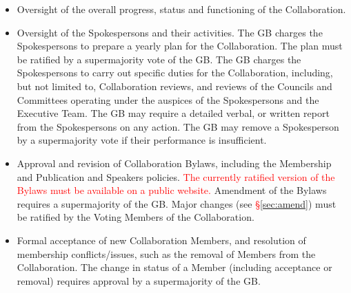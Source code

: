 \documentclass[12pt]{article}
\newcommand{\exec}{{Executive Team}}
\begin{document}
\begin{itemize}
\item Oversight of the overall progress, status and functioning of the Collaboration.  

\item Oversight of the Spokespersons and their activities.  The GB charges the Spokespersons to prepare a yearly plan for the Collaboration.  The plan must be ratified by a supermajority vote of the GB.  The GB charges the Spokespersons to carry out specific duties for the Collaboration, including, but not limited to, Collaboration reviews, and reviews of the Councils and Committees operating under the auspices of the Spokespersons and the \exec.  The GB may require a detailed verbal, or written report from the Spokespersons on any action. The GB may remove a Spokesperson by a supermajority vote if their performance is insufficient. %



\item Approval and revision of Collaboration Bylaws, including the Membership and Publication and Speakers policies.   
\textcolor{red} {The currently ratified version of the Bylaws must be available on a public website.}
Amendment of the Bylaws requires a supermajority of the GB.  Major changes (see \textcolor{red}{\S\ref{sec:amend}}) must be ratified by the Voting Members of the Collaboration.  %



\item Formal acceptance of new Collaboration Members, and resolution of membership conflicts/issues, such as the removal of Members from the Collaboration. The change in status of a Member (including acceptance or removal) requires approval by a supermajority of the GB.


\end{itemize}
\end{document}
